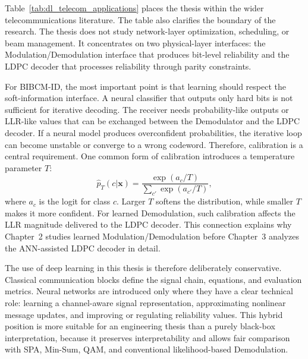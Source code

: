 Table~\ref{tab:dl_telecom_applications} places the thesis within the wider telecommunications literature. The table also clarifies the boundary of the research. The thesis does not study network-layer optimization, scheduling, or beam management. It concentrates on two physical-layer interfaces: the Modulation/Demodulation interface that produces bit-level reliability and the LDPC decoder that processes reliability through parity constraints.

For BIBCM-ID, the most important point is that learning should respect the soft-information interface. A neural classifier that outputs only hard bits is not sufficient for iterative decoding. The receiver needs probability-like outputs or LLR-like values that can be exchanged between the Demodulator and the LDPC decoder. If a neural model produces overconfident probabilities, the iterative loop can become unstable or converge to a wrong codeword. Therefore, calibration is a central requirement. One common form of calibration introduces a temperature parameter $T$:
\begin{equation}
\label{eq:temperature_scaling_ch1}
\hat{p}_T(c|\mathbf{x})=
\frac{\exp(a_c/T)}
{\sum_{c'}\exp(a_{c'}/T)},
\end{equation}
where $a_c$ is the logit for class $c$. Larger $T$ softens the distribution, while smaller $T$ makes it more confident. For learned Demodulation, such calibration affects the LLR magnitude delivered to the LDPC decoder. This connection explains why Chapter~2 studies learned Modulation/Demodulation before Chapter~3 analyzes the ANN-assisted LDPC decoder in detail.

The use of deep learning in this thesis is therefore deliberately conservative. Classical communication blocks define the signal chain, equations, and evaluation metrics. Neural networks are introduced only where they have a clear technical role: learning a channel-aware signal representation, approximating nonlinear message updates, and improving or regulating reliability values. This hybrid position is more suitable for an engineering thesis than a purely black-box interpretation, because it preserves interpretability and allows fair comparison with SPA, Min-Sum, QAM, and conventional likelihood-based Demodulation.
